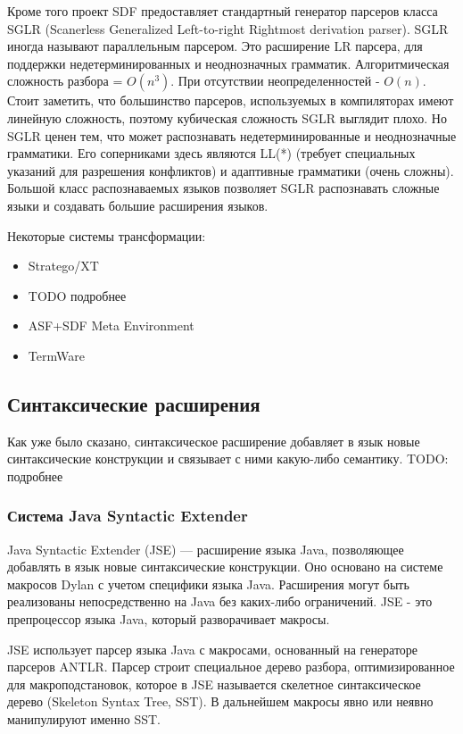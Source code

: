 \documentclass[a4paper,12pt]{article}
\begin{document}
Кроме того проект SDF предоставляет стандартный генератор парсеров класса SGLR
(Scanerless Generalized Left-to-right Rightmost derivation parser). SGLR иногда
называют параллельным парсером. Это расширение LR парсера, для поддержки
недетерминированных и неоднозначных грамматик. Алгоритмическая сложность разбора
= $O(n^3)$. При отсутствии неопределенностей - $O(n)$. Стоит заметить, что
большинство парсеров, используемых в компиляторах имеют линейную сложность,
поэтому кубическая сложность SGLR выглядит плохо. Но SGLR ценен тем, что может
распознавать недетерминированные и неоднозначные грамматики. Его соперниками
здесь являются LL(*) (требует специальных указаний для разрешения конфликтов) и
адаптивные грамматики (очень сложны). Большой класс распознаваемых языков
позволяет SGLR распознавать сложные языки и создавать большие расширения языков.

Некоторые системы трансформации:
\begin{itemize}
  \item Stratego/XT
  \item TODO подробнее
  \item ASF+SDF Meta Environment
  \item TermWare
\end{itemize}

\subsection{Синтаксические расширения}
Как уже было сказано, синтаксическое расширение добавляет в язык новые
синтаксические конструкции и связывает с ними какую-либо семантику.
TODO: подробнее

\subsubsection*{Система Java Syntactic Extender}
\label{jse}
Java Syntactic Extender (JSE) --- расширение языка Java, позволяющее добавлять в
язык новые синтаксические конструкции. Оно основано на системе макросов Dylan с
учетом специфики языка Java. Расширения могут быть реализованы
непосредственно на Java без каких-либо ограничений. JSE - это
препроцессор языка Java, который разворачивает макросы.

JSE использует парсер языка Java с макросами, основанный на генераторе парсеров
ANTLR. Парсер строит специальное дерево разбора, оптимизированное для
макроподстановок, которое в JSE называется скелетное синтаксическое дерево
(Skeleton Syntax Tree, SST). В дальнейшем макросы явно или неявно манипулируют
именно SST.
\end{document}
